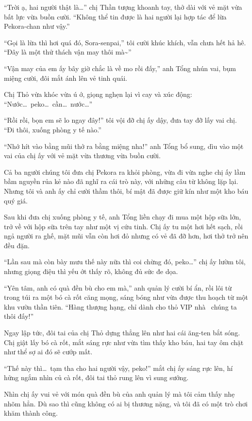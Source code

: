 \documentclass[../main.tex]{subfiles}
\begin{document}
``Trời ạ, hai người thật là\dots'' chị Thần tượng khoanh tay, thở dài với vẻ mặt vừa bất lực vừa buồn cười. ``Không thể tin được là hai người lại hợp tác để lừa Pekora-chan như vậy.''

``Gọi là lừa thì hơi quá đó, Sora-senpai,'' tôi cười khúc khích, vẫn chưa hết hả hê. ``Đây là một thử thách vận may thôi mà\~{}''

``Vận may của em ấy bây giờ chắc là về mo rồi đấy,'' anh Tổng nhún vai, bụm miệng cười, đôi mắt ánh lên vẻ tinh quái.

Chị Thỏ vừa khóc vừa ú ớ, giọng nghẹn lại vì cay và xúc động: ``Nước\dots\ peko\dots\ cần\dots\ nước\dots''

``Rồi rồi, bọn em sẽ lo ngay đây!'' tôi vội đỡ chị ấy dậy, đưa tay đỡ lấy vai chị. ``Đi thôi, xuống phòng y tế nào.''

``Nhớ hít vào bằng mũi thở ra bằng miệng nha!'' anh Tổng bổ sung, dìu vào một vai của chị ấy với vẻ mặt vừa thương vừa buồn cười.

Cả ba người chúng tôi đưa chị Pekora ra khỏi phòng, vừa đi vừa nghe chị ấy lầm bầm nguyền rủa kẻ nào đã nghĩ ra cái trò này, với những câu từ không lặp lại. Nhưng tôi và anh ấy chỉ cười thầm thôi, bí mật đã được giữ kín như một kho báu quý giá.

Sau khi đưa chị xuống phòng y tế, anh Tổng liền chạy đi mua một hộp sữa lớn, trở về với hộp sữa trên tay như một vị cứu tinh. Chị ấy tu một hơi hết sạch, rồi ngả người ra ghế, mặt mũi vẫn còn hơi đỏ nhưng có vẻ đã đỡ hơn, hơi thở trở nên đều đặn.

``Lần sau mà còn bày mưu thế này nữa thì coi chừng đó, peko\dots'' chị ấy lườm tôi, nhưng giọng điệu thì yếu ớt thấy rõ, không đủ sức đe dọa.

``Yên tâm, anh có quà đền bù cho em mà,'' anh quản lý cười bí ẩn, rồi lôi từ trong túi ra một bó cà rốt căng mọng, sáng bóng như vừa được thu hoạch từ một khu vườn thần tiên. ``Hàng thượng hạng, chỉ dành cho thỏ VIP nhà \hll\ chúng ta thôi đấy!''

Ngay lập tức, đôi tai của chị Thỏ dựng thẳng lên như hai cái ăng-ten bắt sóng. Chị giật lấy bó cà rốt, mắt sáng rực như vừa tìm thấy kho báu, hai tay ôm chặt như thể sợ ai đó sẽ cướp mất.

``Thế này thì\dots\ tạm tha cho hai người vậy, peko!'' mắt chị ấy sáng rực lên, hí hửng ngắm nhìn củ cà rốt, đôi tai thỏ rung lên vì sung sướng.

Nhìn chị ấy vui vẻ với món quà đền bù của anh quản lý mà tôi cảm thấy nhẹ nhõm hẳn. Dù sao thì cũng không có ai bị thương nặng, và tôi đã có một trò chơi khăm thành công.
\end{document}
